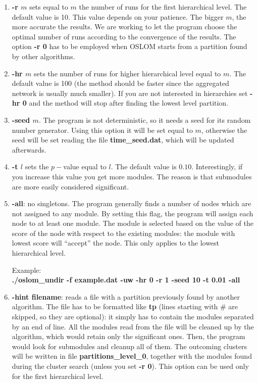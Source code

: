 \documentclass[11pt]{article}
\begin{document}
  
  \begin{enumerate}
  
    \item \textbf{-r $m$} sets equal to $m$ the number of runs for the first
      hierarchical level. The default value is 10. 
This value depends on your patience. The bigger $m$, the more accurate the
results. We are working to let the program choose the optimal number
of runs according to the convergence of the results.
The option {\bf -r 0} has to be employed when OSLOM starts from a
partition found by other algorithms.  
  
   \item \textbf{-hr $m$} sets the number of runs for higher
     hierarchical level equal to $m$. The default value is 100 (the method
     should be faster since the aggregated network is usually much
     smaller). If you are not interested in hierarchies set
     \textbf{-hr 0} and the method will stop after finding the lowest
     level partition.
  
\item \textbf{-seed $m$}. The program is not deterministic, so it
  needs a seed for its random number generator. 
Using this option it will be set equal to $m$, otherwise the seed 
will be set reading the file \textbf{time\_seed.dat}, which will be updated afterwards. 


\item \textbf{-t $l$} sets the $p-$value equal to $l$. The default
  value is $0.10$. Interestingly, if you increase this value you get
  more modules. The reason is that submodules are more easily considered significant.

\item \textbf{-all}: no singletons. The program generally finds a
  number of nodes which are not assigned to any module. By setting this flag, the
  program will assign each node to at least one module.
  The module is selected based on the value of the score of the node
  with respect to the existing modules:
the module with lowest score will ``accept'' the node.  
This only applies to the lowest hierarchical level.

  
    Example:
  \\
  
{ \textbf{./oslom\_undir -f example.dat -uw -hr 0 -r 1 -seed 10 -t 0.01 -all } }

  
  \item \textbf{-hint filename}: reads a file with a partition
    previously found by another algorithm. The file has to be
    formatted like \textbf{tp}  (lines starting with \# are skipped,
    so they are optional): it simply has to contain the modules
    separated by an end of line. All the modules read from the file
    will be cleaned up by the algorithm, 
which would retain only the significant ones. Then, the program would
look for submodules and cleanup all of them. 
The outcoming clusters will be written in file
\textbf{partitions\_level\_0}, together with the 
modules found during the cluster search (unless you set \textbf{-r 0}). This option can be used only for the first hierarchical level.
  \\
  

\end{enumerate}
\end{document}
